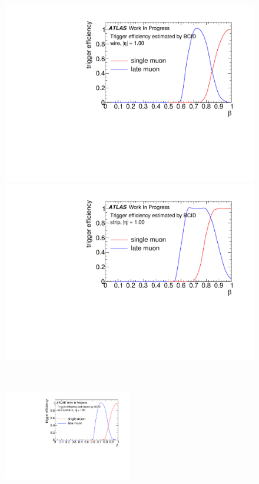 \begin{figure}[tbp]
    \begin{minipage}{0.49\hsize}
    \centering   
    \includegraphics[width=\textwidth,page=2]{img/rec/eff_wire.pdf}
    \subcaption{}
    \end{minipage}
    \begin{minipage}{0.49\hsize}
    \centering   
    \includegraphics[width=\textwidth,page=2]{img/rec/eff_strip.pdf}
    \subcaption{}
    \end{minipage} \\
    \begin{minipage}{0.99\hsize}
    \centering   
    \includegraphics[width=0.5\textwidth,page=2]{img/rec/eff_both.pdf}

\end{minipage}
\end{figure}
